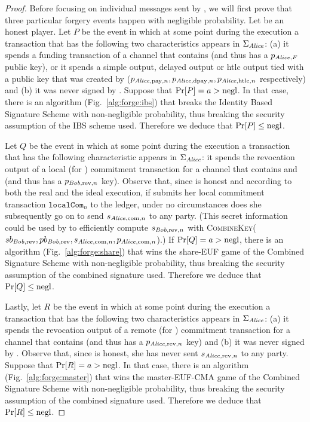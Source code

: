 \begin{proof}
  Before focusing on individual messages sent by \environment, we will first
  prove that three particular forgery events happen with negligible probability.
  Let \alice{} be an honest player. Let $P$ be the event in which at some point
  during the execution a transaction that has the following two characteristics
  appears in $\Sigma_{\mathit{Alice}}$: (a) it spends a funding transaction of a channel
  that contains \alice{} (and thus has a $p_{\mathit{Alice}, F}$ public key), or it
  spends a simple output, delayed output or htlc output tied with a public key
  that was created by \alice{} ($p_{\mathit{Alice}, \mathrm{pay}, n}, p_{\mathit{Alice},
  \mathrm{dpay}, n}, p_{\mathit{Alice}, \mathrm{htlc}, n}$ respectively) and (b) it was
  never signed by \alice. Suppose that $\Pr[P] = a > \text{negl}$. In that case, there
  is an algorithm (Fig.~\ref{alg:forge:ibs}) that breaks the Identity Based
  Signature Scheme with non-negligible probability, thus breaking the security
  assumption of the IBS scheme used. Therefore we deduce that $\Pr[P] \leq
  \text{negl}$.

  Let $Q$ be the event in which at some point during the execution a transaction
  that has the following characteristic appears in $\Sigma_{\mathit{Alice}}$: it spends
  the revocation output of a local (for \alice{}) commitment transaction for a
  channel that contains \alice{} and \bob{} (and thus has a $p_{\mathit{Bob},
  \mathrm{rev}, n}$ key). Observe that, since \alice{} is honest and according
  to both the real and the ideal execution, if \alice{} submits her local
  commitment transaction $\mathtt{localCom}_n$ to the ledger, under no
  circumstances does she subsequently go on to send $s_{\mathit{Alice}, \mathrm{com},
  n}$ to any party. (This secret information could be used by \bob{} to
  efficiently compute $s_{\mathit{Bob}, \mathrm{rev}, n}$ with
  \textsc{CombineKey}($sb_{\mathit{Bob}, \mathrm{rev}}, pb_{\mathit{Bob}, \mathrm{rev}},
  s_{\mathit{Alice}, \mathrm{com}, n}, p_{\mathit{Alice}, \mathrm{com}, n}$).) If $\Pr[Q] = a >
  \text{negl}$, there is an algorithm (Fig.~\ref{alg:forge:share}) that wins the
  \textsf{share-EUF} game of the Combined Signature Scheme with non-negligible
  probability, thus breaking the security assumption of the combined signature
  used. Therefore we deduce that $\Pr[Q] \leq \text{negl}$.

  Lastly, let $R$ be the event in which at some point during the execution a
  transaction that has the following two characteristics appears in
  $\Sigma_{\mathit{Alice}}$: (a) it spends the revocation output of a remote (for
  \alice{}) commitment transaction for a channel that contains \alice{} (and
  thus has a $p_{\mathit{Alice}, \mathrm{rev}, n}$ key) and (b) it was never signed by
  \alice. Observe that, since \alice{} is honest, she has never sent $s_{\mathit{Alice},
  \mathrm{rev}, n}$ to any party. Suppose that $\Pr[R] = a > \text{negl}$. In that
  case, there is an algorithm (Fig.~\ref{alg:forge:master}) that wins the
  \textsf{master-EUF-CMA} game of the Combined Signature Scheme with
  non-negligible probability, thus breaking the security assumption of the
  combined signature used. Therefore we deduce that $\Pr[R] \leq \text{negl}$.


\end{proof}
